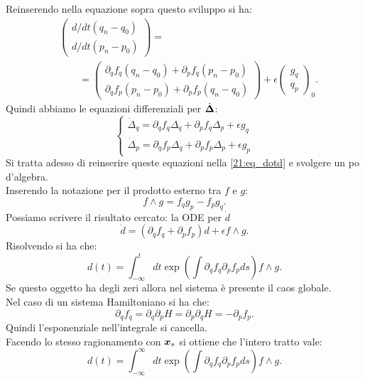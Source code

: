 Reinserendo nella equazione sopra questo sviluppo si ha:
\[\begin{aligned}
    &\begin{pmatrix} d /dt(q_n - q_0) \\ d /dt(p_n - p_0) \end{pmatrix} = \\
    &\qquad = \begin{pmatrix} 
	\partial_{q}f_q(q_n-q_0) + \partial_{p}f_q(p_n-p_0)\\
	\partial_{q}f_p(p_n-p_0) + \partial_{p}f_p(q_n-q_0)
    \end{pmatrix} + \epsilon \begin{pmatrix} g_q \\ q_p \end{pmatrix}_{0}
.\end{aligned}\]
Quindi abbiamo le equazioni differenziali per $\dot{\boldsymbol{\Delta}}$:
\[
    \begin{cases}
        \dot{\Delta}_q = \partial_{q}f_q\Delta_q + \partial_{p}f_q\Delta_p + \epsilon g_q\\
	\dot{\Delta}_p = \partial_{q}f_p \Delta_q + \partial_{p}f_p\Delta_p + \epsilon g_p
    \end{cases}
\] 
Si tratta adesso di reinserire queste equazioni nella \ref{21:eq_dotd} e svolgere un po d'algebra.\\
Inserendo la notazione per il prodotto esterno tra  $f$ e $g$:
\[
    f \wedge g = f_qg_p - f_p g_q
.\] 
Possiamo scrivere il risultato cercato: la ODE per $\dot{d}$
\[
    \dot{d} = (\partial_{q}f_q + \partial_{p}f_p)d + \epsilon f \wedge g
.\] 
Risolvendo si ha che:
\[
    d(t) = \int_{-\infty}^{t} dt \exp\left(\int\partial_{q}f_q \partial_{p}f_p ds\right) f \wedge g
.\] 
Se questo oggetto ha degli zeri allora nel sistema è presente il caos globale.\\
Nel caso di un sistema Hamiltoniano si ha che:
\[
    \partial_{q}f_q = \partial_{q}\partial_{p}H = \partial_{p}\partial_{q}H = - \partial_{p}f_p
.\]
Quindi l'esponenziale nell'integrale si cancella.\\
Facendo lo stesso ragionamento con $\boldsymbol{x}_s$ si ottiene che l'intero tratto vale:
\[
    d(t) = \int_{-\infty}^{\infty} dt \exp\left(\int\partial_{q}f_q \partial_{p}f_p ds\right) f \wedge g
.\] 

